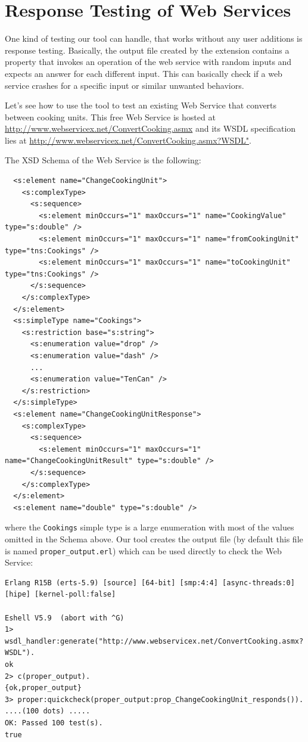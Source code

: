 \documentclass[submission,copyright,a4]{eptcs}
\begin{document}
\section{Response Testing of Web Services} \label{sec:response_testing}

One kind of testing our tool can handle, that works without any user additions is response testing. Basically, 
the output file created by the extension contains a property that invokes an operation of the 
web service with random inputs and expects an answer for each different input. This can basically 
check if a web service crashes for a specific input or similar unwanted behaviors. 

Let's see how to use the tool to test an existing Web Service that
converts between cooking units. This free Web Service is hosted at
\url{http://www.webservicex.net/ConvertCooking.asmx} and its WSDL
specification lies at
\url{http://www.webservicex.net/ConvertCooking.asmx?WSDL"}.

The XSD Schema of the Web Service is the following:
\begin{lstlisting}
  <s:element name="ChangeCookingUnit">
    <s:complexType>
      <s:sequence>
        <s:element minOccurs="1" maxOccurs="1" name="CookingValue" type="s:double" />
        <s:element minOccurs="1" maxOccurs="1" name="fromCookingUnit" type="tns:Cookings" />
        <s:element minOccurs="1" maxOccurs="1" name="toCookingUnit" type="tns:Cookings" />
      </s:sequence>
    </s:complexType>
  </s:element>
  <s:simpleType name="Cookings">
    <s:restriction base="s:string">
      <s:enumeration value="drop" />
      <s:enumeration value="dash" />
      ...
      <s:enumeration value="TenCan" />
    </s:restriction>
  </s:simpleType>
  <s:element name="ChangeCookingUnitResponse">
    <s:complexType>
      <s:sequence>
        <s:element minOccurs="1" maxOccurs="1" name="ChangeCookingUnitResult" type="s:double" />
      </s:sequence>
    </s:complexType>
  </s:element>
  <s:element name="double" type="s:double" />
\end{lstlisting}
where the \texttt{Cookings} simple type is a large enumeration with
most of the values omitted in the Schema above. Our tool creates the
output file (by default this file is named
\texttt{proper\_output.erl}) which can be used directly to check the
Web Service:

\begin{lstlisting}
Erlang R15B (erts-5.9) [source] [64-bit] [smp:4:4] [async-threads:0] [hipe] [kernel-poll:false]

Eshell V5.9  (abort with ^G)
1> wsdl_handler:generate("http://www.webservicex.net/ConvertCooking.asmx?WSDL").
ok
2> c(proper_output).
{ok,proper_output}
3> proper:quickcheck(proper_output:prop_ChangeCookingUnit_responds()).
....(100 dots) .....
OK: Passed 100 test(s).
true
\end{lstlisting}
\end{document}
